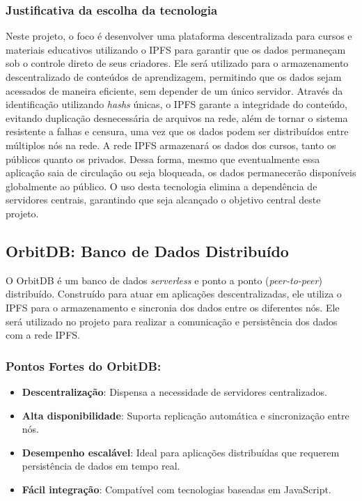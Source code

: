 \subsubsection{Justificativa da escolha da tecnologia}
Neste projeto, o foco é desenvolver uma plataforma descentralizada para cursos e materiais educativos utilizando o IPFS para garantir que os dados permaneçam sob o controle direto de seus criadores. Ele será utilizado para o armazenamento descentralizado de conteúdos de aprendizagem, permitindo que os dados sejam acessados de maneira eficiente, sem depender de um único servidor. Através da identificação utilizando \textit{hashs} únicas, o IPFS garante a integridade do conteúdo, evitando duplicação desnecessária de arquivos na rede, além de tornar o sistema resistente a falhas e censura, uma vez que os dados podem ser distribuídos entre múltiplos nós na rede. A rede IPFS armazenará os dados dos cursos, tanto os públicos quanto os privados. Dessa forma, mesmo que eventualmente essa aplicação saia de circulação ou seja bloqueada, os dados permanecerão disponíveis globalmente ao público. O uso desta tecnologia elimina a dependência de servidores centrais, garantindo que seja alcançado o objetivo central deste projeto.

\subsection{OrbitDB: Banco de Dados Distribuído}

O OrbitDB é um banco de dados \textit{serverless} e ponto a ponto (\textit{peer-to-peer}) distribuído. Construído para atuar em aplicações descentralizadas, ele utiliza o IPFS para o armazenamento e sincronia dos dados entre os diferentes nós. Ele será utilizado no projeto para realizar a comunicação e persistência dos dados com a rede IPFS.

\subsubsection*{Pontos Fortes do OrbitDB:}
\begin{itemize}
    \item \textbf{Descentralização}: Dispensa a necessidade de servidores centralizados.
    \item \textbf{Alta disponibilidade}: Suporta replicação automática e sincronização entre nós.
    \item \textbf{Desempenho escalável}: Ideal para aplicações distribuídas que requerem persistência de dados em tempo real.
    \item \textbf{Fácil integração}: Compatível com tecnologias baseadas em JavaScript.
\end{itemize}

